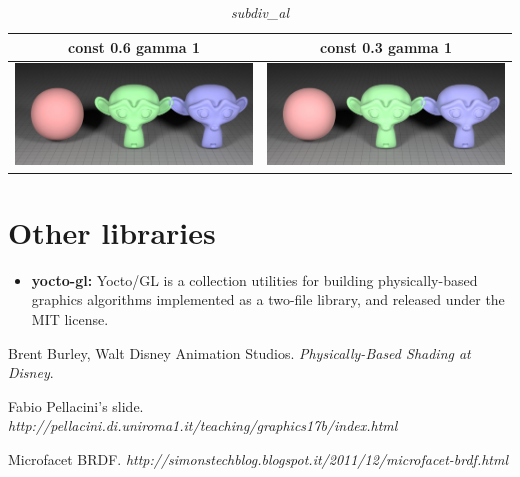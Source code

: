 \documentclass[11pt]{article}
\begin{document}
\begin{table}[ht]
  \centering
  \begin{tabular}{ | c | c | }
    \hline
    const 0.6 gamma 1 & const 0.3 gamma 1 \\ \hline
    \begin{minipage}{.3\textwidth}
      \includegraphics[scale=0.1]{img/obj/subdiv_al/subdiv_al_disney_dc03_dg1.jpg}
    \end{minipage}
    &
    \begin{minipage}{.3\textwidth}
      \includegraphics[scale=0.1]{img/obj/subdiv_al/subdiv_al_disney_dg1.jpg}
    \end{minipage}
    \\ \hline
  \end{tabular}
  \caption{\textit{subdiv\_al}}\label{tbl:myLboro}
\end{table}


\section{Other libraries}
\begin{itemize}
	\item \textbf{yocto-gl:}
		Yocto/GL is a collection utilities for building physically-based graphics algorithms implemented as a two-file library, and released under the MIT license.
		
\end{itemize}

\begin{thebibliography}{9}
	Brent Burley, Walt Disney Animation Studios. 
	\textit{Physically-Based Shading at Disney}.
	
	Fabio Pellacini's slide. 
	\textit{http://pellacini.di.uniroma1.it/teaching/graphics17b/index.html}

	Microfacet BRDF. 
	\textit{http://simonstechblog.blogspot.it/2011/12/microfacet-brdf.html}
	
	
	
\end{thebibliography}
\end{document}
